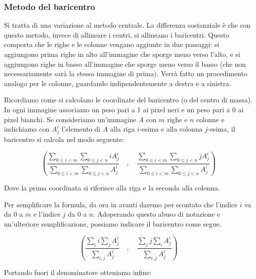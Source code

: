 \subsubsection{Metodo del baricentro}

Si tratta di una variazione al metodo centrale. La differenza sostanziale \`e che con questo metodo, invece di allineare i centri, si allineano i baricentri. Questo comporta che le righe e le colonne vengano aggiunte in due passaggi: si aggiungono prima righe in alto all'immagine che sporge meno verso l'alto, e si aggiungono righe in basso all'immagine che sporge meno verso il basso (che non necessariamente sar\`a la stessa immagine di prima). Verr\`a fatto un procedimento analogo per le colonne, guardando indipendentemente a destra e a sinistra.

Ricordiamo come si calcolano le coordinate del baricentro (o del centro di massa). In ogni immagine associamo un peso pari a 1 ai pixel neri e un peso pari a 0 ai pixel bianchi. Se consideriamo un'immagine $A$ con $m$ righe e $n$ colonne e indichiamo con $A^i_j$ l'elemento di $A$ alla riga $i$-esima e alla colonna $j$-esima, il baricentro si calcola nel modo seguente:

\begin{equation*}
    \left( 
        \frac
            {\displaystyle{\sum_{0 \le i < m} \sum_{0 \le j < n} i A^i_j}}
            {\displaystyle{\sum_{0 \le i < m} \sum_{0 \le j < n} A^i_j}}
        \quad , \quad
        \frac
            {\displaystyle{\sum_{0 \le i < m} \sum_{0 \le j < n} j A^i_j}}
            {\displaystyle{\sum_{0 \le i < m} \sum_{0 \le j < n} A^i_j}}
    \right)
\end{equation*}

Dove la prima coordinata si riferisce alla riga e la seconda alla colonna.

Per semplificare la formula, da ora in avanti daremo per scontato che l'indice $i$ va da 0 a $m$ e l'indice $j$ da 0 a $n$. Adoperando questo abuso di notazione e un'ulteriore semplificazione, possiamo indicare il baricentro come segue.

\begin{equation*}
    \left(
        \frac
            {\displaystyle{\sum_i i \sum_j A^i_j}}
            {\displaystyle{\sum_{i,j} A^i_j}}
        \quad , \quad
        \frac
            {\displaystyle{\sum_j j \sum_i A^i_j}}
            {\displaystyle{\sum_{i,j} A^i_j}}
    \right)
\end{equation*}

Portando fuori il denominatore otteniamo infine:

